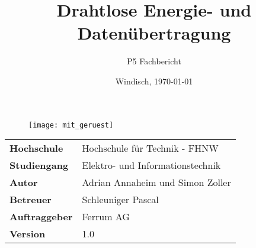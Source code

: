 \documentclass[final]{fhnwreport}       %
\title{Drahtlose Energie- und Datenübertragung}          %
\author{P5 Fachbericht}          		%
\date{Windisch, {\today}}             	%
\begin{document}
\maketitle

\vspace*{-1cm}						    %
\vfill
\begin{figure}[H]
\centering
\texttt{[image: mit\_geruest]}
\end{figure}
\vfill

{
\renewcommand\arraystretch{2}
\begin{center}
\begin{tabular}{>{\bf}p{4cm} l}
Hochschule                 &    Hochschule für Technik - FHNW\\
Studiengang                &    Elektro- und Informationstechnik\\
Autor   		           & 	Adrian Annaheim und Simon Zoller\\
Betreuer                   &    Schleuniger Pascal\\
Auftraggeber               &    Ferrum AG\\
Version                    &    1.0 %
\end{tabular}
\end{center}
}

\clearpage
			
%

\tableofcontents
\clearpage







{\sloppypar
\printbibliography[heading=bibintoc]
\label{sec:lit}
\printbibliography[heading=bibintoc]
}



{%
}
\end{document}
